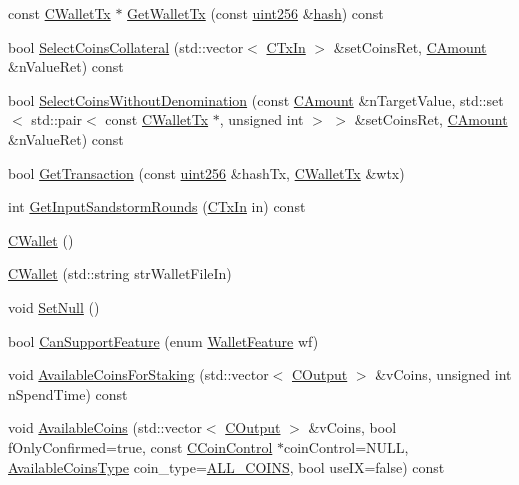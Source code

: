 \begin{DoxyCompactItemize}
\item 
const \hyperlink{class_c_wallet_tx}{C\+Wallet\+Tx} $\ast$ \hyperlink{class_c_wallet_abdffee587c00bc1ebea53ea26f3efa61}{Get\+Wallet\+Tx} (const \hyperlink{classuint256}{uint256} \&\hyperlink{cache_8cc_a11ecb029164e055f28f4123ce3748862}{hash}) const 
\item 
bool \hyperlink{class_c_wallet_a94a3b61e3a5749622b0afcff195a44ee}{Select\+Coins\+Collateral} (std\+::vector$<$ \hyperlink{class_c_tx_in}{C\+Tx\+In} $>$ \&set\+Coins\+Ret, \hyperlink{amount_8h_a4eaf3a5239714d8c45b851527f7cb564}{C\+Amount} \&n\+Value\+Ret) const 
\item 
bool \hyperlink{class_c_wallet_a1eedb3b9e0f2783b9405d27e373d0537}{Select\+Coins\+Without\+Denomination} (const \hyperlink{amount_8h_a4eaf3a5239714d8c45b851527f7cb564}{C\+Amount} \&n\+Target\+Value, std\+::set$<$ std\+::pair$<$ const \hyperlink{class_c_wallet_tx}{C\+Wallet\+Tx} $\ast$, unsigned int $>$ $>$ \&set\+Coins\+Ret, \hyperlink{amount_8h_a4eaf3a5239714d8c45b851527f7cb564}{C\+Amount} \&n\+Value\+Ret) const 
\item 
bool \hyperlink{class_c_wallet_af11074b729403d68ee9e56f1a4654796}{Get\+Transaction} (const \hyperlink{classuint256}{uint256} \&hash\+Tx, \hyperlink{class_c_wallet_tx}{C\+Wallet\+Tx} \&wtx)
\item 
int \hyperlink{class_c_wallet_ac0780b1a8f4092d5a01cf1fa615514a4}{Get\+Input\+Sandstorm\+Rounds} (\hyperlink{class_c_tx_in}{C\+Tx\+In} in) const 
\item 
\hyperlink{class_c_wallet_aba6468969795160865ea329281941d95}{C\+Wallet} ()
\item 
\hyperlink{class_c_wallet_a43878f79c7bc54f7af0884aa1da07b59}{C\+Wallet} (std\+::string str\+Wallet\+File\+In)
\item 
void \hyperlink{class_c_wallet_aba7996da1912459832dcbffdaed933a3}{Set\+Null} ()
\item 
bool \hyperlink{class_c_wallet_a83766f3d6797dba08c5ea136fa417c4d}{Can\+Support\+Feature} (enum \hyperlink{wallet_8h_a39a6b71da3eb95cddc0836d3b27ac7c9}{Wallet\+Feature} wf)
\item 
void \hyperlink{class_c_wallet_a4b9d5939e15cbb0cae162224beb35fc8}{Available\+Coins\+For\+Staking} (std\+::vector$<$ \hyperlink{class_c_output}{C\+Output} $>$ \&v\+Coins, unsigned int n\+Spend\+Time) const 
\item 
void \hyperlink{class_c_wallet_ad165e7a24c95ff9a5816933d7ca23c9b}{Available\+Coins} (std\+::vector$<$ \hyperlink{class_c_output}{C\+Output} $>$ \&v\+Coins, bool f\+Only\+Confirmed=true, const \hyperlink{class_c_coin_control}{C\+Coin\+Control} $\ast$coin\+Control=N\+U\+L\+L, \hyperlink{wallet_8h_a90b09b05f289ac32704a6446a94566ce}{Available\+Coins\+Type} coin\+\_\+type=\hyperlink{wallet_8h_a90b09b05f289ac32704a6446a94566cea94cc8a0e81d9490cdbdfc3d3f215e9e7}{A\+L\+L\+\_\+\+C\+O\+I\+N\+S}, bool use\+I\+X=false) const 

\end{DoxyCompactItemize}
